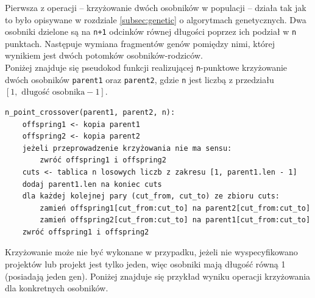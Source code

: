 \documentclass[12pt,a4paper]{article}
\theoremstyle{definition}
\begin{document}
\noindent
Pierwsza z operacji -- krzyżowanie dwóch osobników w populacji -- działa tak jak to było opisywane w rozdziale \ref{subsec:genetic} o algorytmach genetycznych. Dwa osobniki dzielone są na \texttt{n+1} odcinków równej długości poprzez ich podział w \texttt{n} punktach. Następuje wymiana fragmentów genów pomiędzy nimi, której wynikiem jest dwóch potomków osobników-rodziców.\\

\noindent
Poniżej znajduje się pseudokod funkcji realizującej \texttt{n}-punktowe krzyżowanie dwóch osobników \texttt{parent1} oraz \texttt{parent2}, gdzie \texttt{n} jest liczbą z przedziału $[1, \text{ długość osobnika} - 1]$.\\

\begin{tcolorbox}[title=Krzyżowanie dwóch osobników]
\begin{verbatim}
n_point_crossover(parent1, parent2, n):
    offspring1 <- kopia parent1
    offspring2 <- kopia parent2
    jeżeli przeprowadzenie krzyżowania nie ma sensu:
        zwróć offspring1 i offspring2
    cuts <- tablica n losowych liczb z zakresu [1, parent1.len - 1]
    dodaj parent1.len na koniec cuts
    dla każdej kolejnej pary (cut_from, cut_to) ze zbioru cuts:
        zamień offspring1[cut_from:cut_to] na parent2[cut_from:cut_to]
        zamień offspring2[cut_from:cut_to] na parent1[cut_from:cut_to]
    zwróć offspring1 i offspring2
\end{verbatim}
\end{tcolorbox}

\vspace{0.5em}
\noindent
Krzyżowanie może nie być wykonane w przypadku, jeżeli nie wyspecyfikowano projektów lub projekt jest tylko jeden, więc osobniki mają długość równą 1 (posiadają jeden gen). Poniżej znajduje się przykład wyniku operacji krzyżowania dla konkretnych osobników.\\
\end{document}
